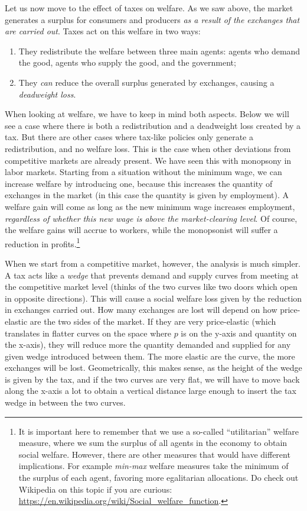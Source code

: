 \documentclass[11pt,english]{article}
\begin{document}
Let us now move to the effect of taxes on welfare. As we saw above, the market generates a surplus for consumers and producers \emph{as a result of the exchanges that are carried out}. Taxes act on this welfare in two ways:
\begin{enumerate}
	\item They redistribute the welfare between three main agents: agents who demand the good, agents who supply the good, and the government;
	\item They \emph{can} reduce the overall surplus generated by exchanges, causing a \emph{deadweight loss}. 
\end{enumerate}
When looking at welfare, we have to keep in mind both aspects. Below we will see a case where there is both a redistribution and a deadweight loss created by a tax. But there are other cases where tax-like policies only generate a redistribution, and no welfare loss. This is the case when other deviations from competitive markets are already present. We have seen this with monopsony in labor markets. Starting from a situation without the minimum wage, we can increase welfare by introducing one, because this increases the quantity of exchanges in the market (in this case the quantity is given by employment). A welfare gain will come as long as the new minimum wage increases employment, \textit{regardless of whether this new wage is above the market-clearing level}. Of course, the welfare gains will accrue to workers, while the monopsonist will suffer a reduction in profits.\footnote{It is important here to remember that we use a so-called ``utilitarian'' welfare measure, where we sum the surplus of all agents in the economy to obtain social welfare. However, there are other measures that would have different implications. For example \textit{min-max} welfare measures take the minimum of the surplus of each agent, favoring more egalitarian allocations. Do check out Wikipedia on this topic if you are curious: \url{https://en.wikipedia.org/wiki/Social_welfare_function}.} 

When we start from a competitive market, however, the analysis is much simpler. A tax acts like a \textit{wedge} that prevents demand and supply curves from meeting at the competitive market level (thinks of the two curves like two doors which open in opposite directions). This will cause a social welfare loss given by the reduction in exchanges carried out. How many exchanges are lost will depend on how price-elastic are the two sides of the market. If they are very price-elastic (which translates in flatter curves on the space where $p$ is on the y-axis and quantity on the x-axis), they will reduce more the quantity demanded and supplied for any given wedge introduced between them. The more elastic are the curve, the more exchanges will be lost. Geometrically, this makes sense, as the height of the wedge is given by the tax, and if the two curves are very flat, we will have to move back along the x-axis a lot to obtain a vertical distance large enough to insert the tax wedge in between the two curves.
\end{document}
